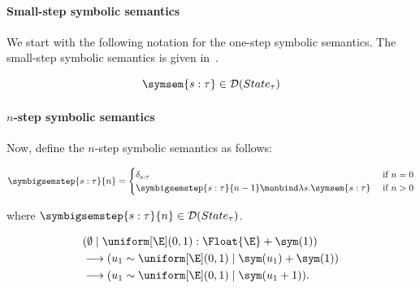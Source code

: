 \paragraph{Small-step symbolic semantics}
We start with the following notation for the one-step symbolic semantics. The small-step symbolic semantics is given in~.

\[
  \symsem{s : \tau} \in \mathcal{D}(State_\tau)
\]

\paragraph{$n$-step symbolic semantics}
Now, define the $n$-step symbolic semantics as follows:

\begin{align*}
  \symbigsemstep{s : \tau}{n} =
  \begin{cases}
    \delta_{s : \tau} &\text{ if } n = 0 \\
    \symbigsemstep{s : \tau}{n-1} \monbind \lambda s. \symsem{s : \tau} &\text{ if } n > 0
  \end{cases}
\end{align*}

where $\symbigsemstep{s : \tau}{n} \in \mathcal{D}(State_\tau)$.

\begin{example}
  \[
  \begin{aligned}
    &(\emptyset \mid \uniform[\E](0,1) : \Float{\E} + \sym(1)) \\
    &\longrightarrow
	    (u_1 \sim \uniform[\E](0,1)
	      \mid \sym(u_1) + \sym(1)) \\
	    &\longrightarrow
	    (u_1 \sim \uniform[\E](0,1)
	      \mid \sym(u_1 + 1)).
  \end{aligned}
  \]
\end{example}


